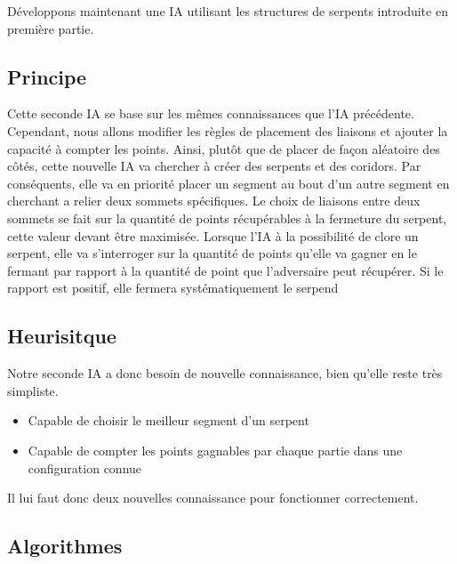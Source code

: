 \documentclass[a4paper,12pt]{report}
\begin{document}
D\'eveloppons maintenant une IA utilisant les structures de serpents introduite en premi\`ere partie. 

\subsection{Principe}

Cette seconde IA se base sur les m\^emes connaissances que l'IA pr\'ec\'edente. Cependant, nous allons modifier les r\`egles de placement des liaisons et ajouter la capacit\'e \`a compter les points. Ainsi, plut\^ot que de placer de fa\c{c}on al\'eatoire des c\^ot\'es, cette nouvelle IA va chercher \`a cr\'eer des serpents et des coridors. Par cons\'equents, elle va en priorit\'e placer un segment au bout d'un autre segment en cherchant a relier deux sommets sp\'ecifiques. Le choix de liaisons entre deux sommets se fait sur la quantit\'e de points r\'ecup\'erables \`a la fermeture du serpent, cette valeur devant \^etre maximis\'ee. Lorsque l'IA \`a la possibilit\'e de clore un serpent, elle va s'interroger sur la quantit\'e de points qu'elle va gagner en le fermant par rapport \`a la quantit\'e de point que l'adversaire peut r\'ecup\'erer. Si le rapport est positif, elle fermera syst\'ematiquement le serpend

\subsection{Heurisitque}

Notre seconde IA a donc besoin de nouvelle connaissance, bien qu'elle reste tr\`es simpliste.

\begin{itemize}
 \item Capable de choisir le meilleur segment d'un serpent
 \item Capable de compter les points gagnables par chaque partie dans une configuration connue
\end{itemize}

Il lui faut donc deux nouvelles connaissance pour fonctionner correctement.

\subsection{Algorithmes}
\end{document}
